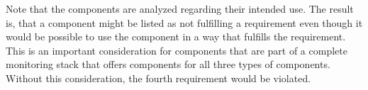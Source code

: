 Note that the components are analyzed regarding their intended use.
The result is, that a component might be listed as not fulfilling a requirement even though it would be possible
to use the component in a way that fulfills the requirement. This is an important consideration for components
that are part of a complete monitoring stack that offers components for all three types of components.
Without this consideration, the fourth requirement would be violated.




